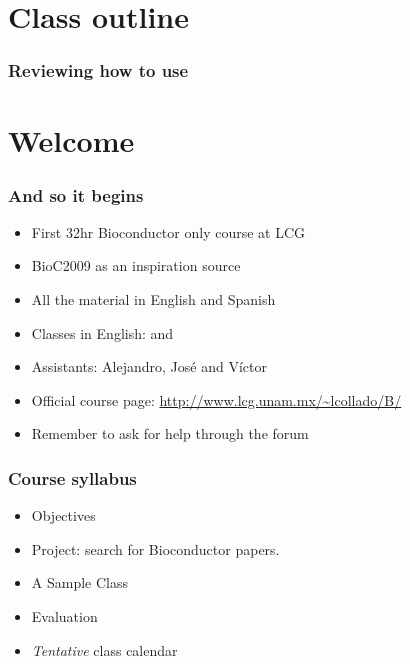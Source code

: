 




\usepackage{Sweave}


\begin{frame}[allowframebreaks]
  \titlepage
\end{frame}

\section*{Class outline}

\begin{frame}[allowframebreaks]
  \frametitle{Reviewing how to use }
  \tableofcontents[hideallsubsections]
\end{frame}

\section{Welcome}

\begin{frame}[allowframebreaks]
  \frametitle{And so it begins}
  \begin{itemize}
  \item First 32hr Bioconductor only course at LCG
  \item BioC2009 as an inspiration source
  \item All the material in English and Spanish
  \item Classes in English:  and 
  \item Assistants: Alejandro, Jos\'e and V\'ictor
  \item Official course page: \url{http://www.lcg.unam.mx/~lcollado/B/}
  \item Remember to ask for help through the forum
  \end{itemize}
\end{frame}

\begin{frame}[allowframebreaks]
  \frametitle{Course syllabus}
  \begin{itemize}
  \item Objectives
  \item Project: search for Bioconductor papers.
  \item A Sample Class
  \item Evaluation
  \item \emph{Tentative} class calendar
  \end{itemize}
\end{frame}

